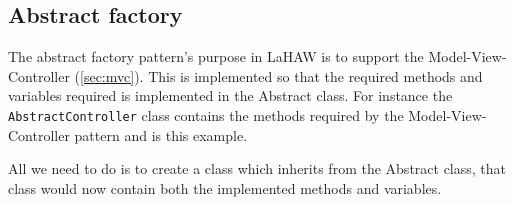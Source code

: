











\subsection{Abstract factory}
\label{sec:absfac}
The abstract factory pattern's purpose in LaHAW is to support the Model-View-Controller (\ref{sec:mvc}). This is implemented so that the required methods and variables required is implemented in the Abstract class. 
For instance the \texttt{AbstractController} class contains the methods required by the Model-View-Controller pattern and is this example. %

All we need to do is to create a class which inherits from the Abstract class, that class would now contain both the implemented methods and variables.



